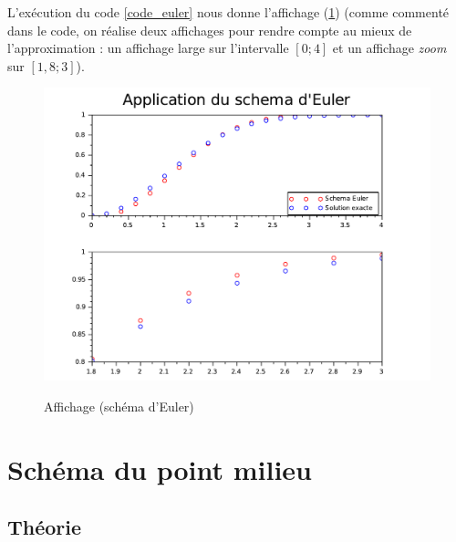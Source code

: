 \documentclass[a4paper,10pt]{report}
\begin{document}
L'exécution du code \ref{code_euler} nous donne l'affichage (\ref{graph_euler}) (comme commenté dans le code, on réalise deux affichages pour rendre compte au mieux de l'approximation : un affichage large sur l'intervalle $[0;4]$ et un affichage \textit{zoom} sur $[1,8;3]$).
\begin{figure}[H]
\centering
\caption{Affichage (schéma d'Euler)}
\includegraphics[width=\textwidth]{euler.pdf}
\label{graph_euler}
\end{figure}

\section{Schéma du point milieu}
\subsection{Théorie}
\end{document}
